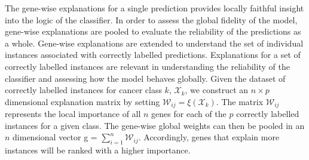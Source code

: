 The gene-wise explanations for a single prediction provides locally faithful insight into the logic of the classifier. In order to assess the global fidelity of the model, gene-wise explanations are pooled to evaluate the reliability of the predictions as a whole. Gene-wise explanations are extended to understand the set of individual instances associated with correctly labelled predictions. Explanations for a set of correctly labelled instances are relevant in understanding the reliability of the classifier and assessing how the model behaves globally. Given the dataset of correctly labelled instances for cancer class $k$, $\mathcal{X}_k$, we construct an $n \times p$ dimensional explanation matrix by setting $\mathcal{W}_{ij} = \xi(\mathcal{X}_k)$. The matrix $\mathcal{W}_{ij}$ represents the local importance of all $n$ genes for each of the $p$ correctly labelled instances for a given class. The gene-wise global weights can then be pooled in an $n$ dimensional vector g = $\sum_{i=1}^{n}\mathcal{W}_{ij}$. Accordingly, genes that explain more instances will be ranked with a higher importance.

